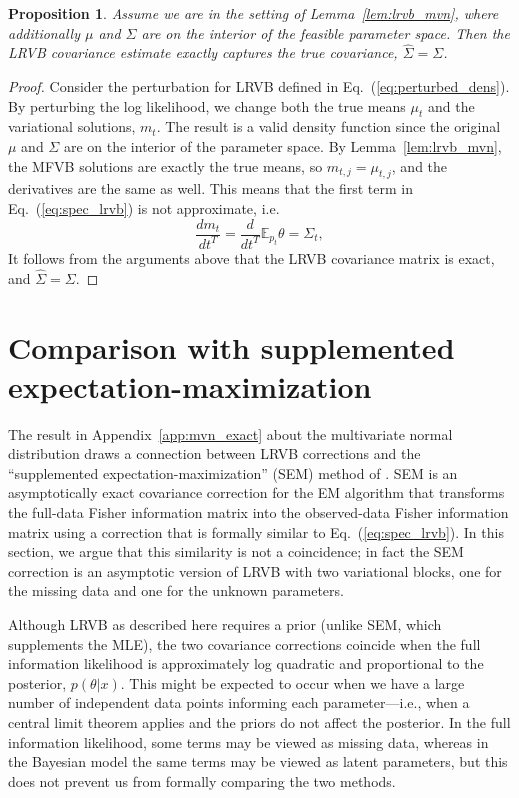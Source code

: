 \documentclass{article}\usepackage[]{graphicx}\usepackage[]{color}
\newcommand{\app}[1]{Appendix~\ref{app:#1}}
\newcommand{\lem}[1]{Lemma~\ref{lem:#1}}
\newcommand{\eq}[1]{Eq.~(\ref{eq:#1})}
\newcommand{\mpq}{m} %
\newcommand{\truecov}{\Sigma} %
\theoremstyle{plain}
\newtheorem{proposition}[theorem]{Proposition}
\newcommand{\mbe}{\mathbb{E}}
\begin{document}
\begin{proposition} \label{prop:lrvb_mvn}
  Assume we are in the setting of \lem{lrvb_mvn}, where additionally
  $\mu$ and $\Sigma$ are on the interior of the feasible parameter space.
  Then the LRVB covariance estimate exactly captures the true covariance,
  $\hat{\Sigma} = \Sigma$.

\end{proposition}

\begin{proof}

  Consider the perturbation for LRVB defined in \eq{perturbed_dens}.
  By perturbing the log likelihood, we change both the true means $\mu_t$
  and the variational solutions, $m_t$. The result is a valid
  density function since the original $\mu$ and $\Sigma$ are on the
  interior of the parameter space.
  By \lem{lrvb_mvn}, the MFVB solutions are exactly the true
  means, so $m_{t,j} = \mu_{t,j}$, and the derivatives are the same
  as well.  This means that the first term in \eq{spec_lrvb} is
  not approximate, i.e.
%
  \begin{equation*}
  \frac{d \mpq_{t}}{d t^{T}}
    = \frac{d}{d t^{T}} \mbe_{p_{t}} \theta
    = \truecov_{t},
  \end{equation*}
%
  It follows from the arguments above that the LRVB covariance
  matrix is exact, and $\hat{\Sigma} = \Sigma$.

\end{proof}


\section{Comparison with supplemented expectation-maximization}\label{app:SEM}

The result in \app{mvn_exact} about the multivariate normal distribution
draws a connection between LRVB
corrections and the ``supplemented expectation-maximization'' (SEM)
method of \citep{meng:1991:using}.  SEM is an asymptotically
exact covariance correction for the EM algorithm that transforms
the full-data Fisher information matrix into the observed-data Fisher
information matrix using a correction that is formally similar to
\eq{spec_lrvb}.  In this section, we argue that this similarity
is not a coincidence; in fact the SEM correction is an
asymptotic version of LRVB with two variational blocks,
one for the missing data and one for the unknown parameters.

Although LRVB as described here requires a prior
(unlike SEM, which supplements the MLE),
the two covariance corrections coincide when
the full information likelihood is approximately log quadratic
and proportional to the posterior, $p(\theta \vert x)$.
This might be expected to occur when we have a large number
of independent data points informing each parameter---i.e.,
when a central limit theorem applies and the priors do not
affect the posterior.
In the full information likelihood, some
terms may be viewed as missing data, whereas in the Bayesian
model the same terms may be viewed as latent parameters,
but this does not prevent us from formally comparing the two methods.
\end{document}
